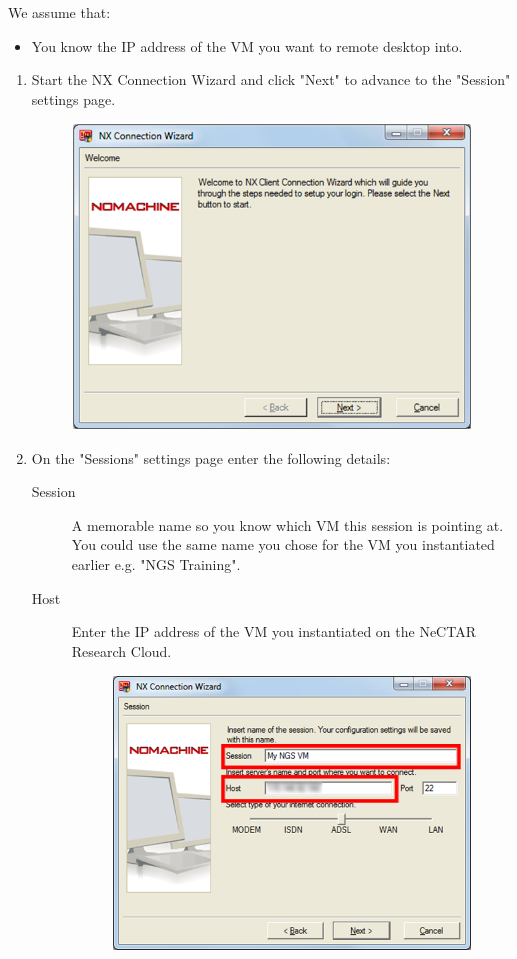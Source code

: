 We assume that:
\begin{itemize}
\item You know the IP address of the VM you want to remote desktop into.
\end{itemize}

\begin{enumerate}
  \item Start the NX Connection Wizard and click "Next" to advance to the
  "Session" settings page.
  \begin{figure}[H]
    \centering
    \includegraphics[scale=0.5]{nx_client/start_wizard.png}
    \caption{\label{fig:nx_start_wizard}}
  \end{figure}
  \item On the "Sessions" settings page enter the following details:
  \begin{description}
  \item[Session] A memorable name so you know which VM this session is pointing
  at. You could use the same name you chose for the VM you instantiated earlier
  e.g. "NGS Training".
  \item[Host] Enter the IP address of the VM you instantiated on the NeCTAR
  Research Cloud.
  \begin{figure}[H]
    \centering
    \includegraphics[scale=0.5]{nx_client/session_configuration.png}

\end{figure}
\end{description}
\end{enumerate}
